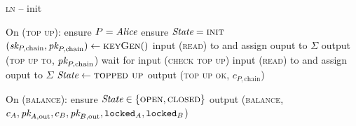 \begin{center}
\begin{processbox}{\textsc{ln} -- init}
\begin{algorithmic}[1]
      \State On (\textsc{top up}):
      \Indent
        \State ensure $P = \mathit{Alice}$ 
        \State ensure $\itistate = \textsc{init}$
        \label{code:ln:init:change-state}
        \State $(\textit{sk}_{P, \mathrm{chain}}, \textit{pk}_{P, \mathrm{chain}}) \gets
        \textsc{keyGen}()$
        \State input (\textsc{read}) to \ledger and assign ouput to $\Sigma$
        \State output (\textsc{top up to}, $\textit{pk}_{P, \mathrm{chain}}$)
          \State {}
          \State wait for input (\textsc{check top up})
          \State input (\textsc{read}) to \ledger and assign ouput to $\Sigma$
        \EndWhile
        \State $\itistate \gets \textsc{topped up}$
        \State output (\textsc{top up ok}, $c_{P, \mathrm{chain}}$)
      \EndIndent
      \Statex

      \State On (\textsc{balance}):
      \Indent
        \State ensure $\itistate \in \{\textsc{open}, \textsc{closed}\}$
        \label{code:functionality:chan:skeleton:base:balance:start}
        \State output (\textsc{balance}, $c_A, \textit{pk}_{A, \mathrm{out}}, c_B, \textit{pk}_{B,
        \mathrm{out}}, \texttt{locked}_A, \texttt{locked}_B$)
        \label{code:functionality:chan:skeleton:base:balance:end}
      \EndIndent
    \end{algorithmic}
  \end{processbox}
  \label{code:ln:init}
\end{center} \ \\


